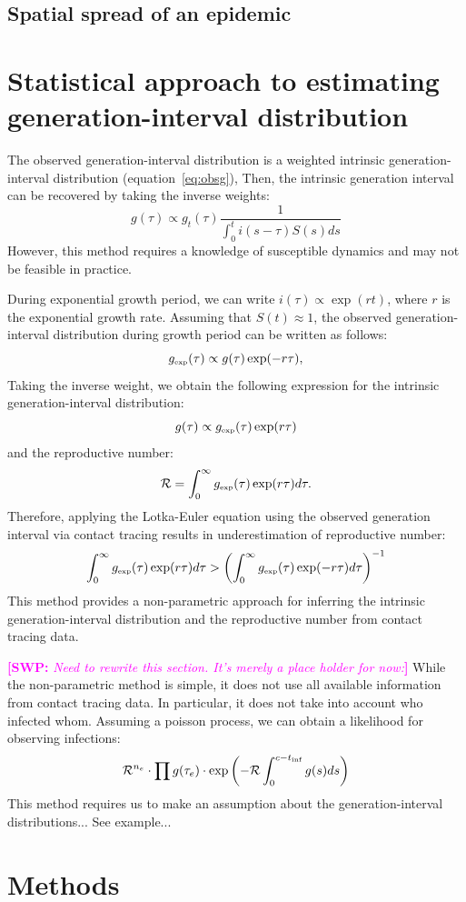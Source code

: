 \documentclass{article}
\newcommand{\RR}{\ensuremath{{\mathcal R}}}
\newcommand{\tsub}[2]{#1_{{\textrm{\tiny #2}}}}
\newcommand{\comment}[3]{\textcolor{#1}{\textbf{[#2: }\textsl{#3}\textbf{]}}}
\newcommand{\swp}[1]{\comment{magenta}{SWP}{#1}}
\begin{document}
\subsection{Spatial spread of an epidemic}

\section{Statistical approach to estimating generation-interval distribution}

The observed generation-interval distribution is a weighted intrinsic generation-interval distribution (equation~\ref{eq:obsg}),
Then, the intrinsic generation interval can be recovered by taking the inverse weights:
\begin{equation}
g(\tau) \propto g_t(\tau) \frac{1}{\int_{0}^t i(s-\tau) S(s) ds}
\end{equation}
However, this method requires a knowledge of susceptible dynamics and may not be feasible in practice.

During exponential growth period, we can write $i(\tau) \propto \exp(r t)$, where $r$ is the exponential growth rate.
Assuming that $S(t) \approx 1$, the observed generation-interval distribution during growth period can be written as follows:
\begin{equation}
\tsub{g}{exp}(\tau) \propto g(\tau) \exp(-r\tau),
\end{equation}
Taking the inverse weight, we obtain the following expression for the intrinsic generation-interval distribution:
\begin{equation}
g(\tau) \propto \tsub{g}{exp}(\tau) \exp(r\tau)
\end{equation}
and the reproductive number:
\begin{equation}
\RR = \int_0^\infty \tsub{g}{exp}(\tau) \exp(r\tau) d\tau.
\end{equation}
Therefore, applying the Lotka-Euler equation using the observed generation interval via contact tracing results in underestimation of reproductive number:
\begin{equation}
\int_0^\infty \tsub{g}{exp}(\tau) \exp(r\tau) d\tau > \left(\int_0^\infty \tsub{g}{exp}(\tau) \exp(-r\tau) d\tau\right)^{-1}
\end{equation}
This method provides a non-parametric approach for inferring the intrinsic generation-interval distribution and the reproductive number from contact tracing data.

\swp{Need to rewrite this section. It's merely a place holder for now:}
While the non-parametric method is simple, it does not use all available information from contact tracing data.
In particular, it does not take into account who infected whom.
Assuming a poisson process, we can obtain a likelihood for observing infections:
\begin{equation}
\RR^{n_e} \cdot \prod g(\tau_e) \cdot \exp \left(- \RR \int_0^{c - t_{\tiny\textrm{inf}}} g(s) ds \right)
\end{equation}
This method requires us to make an assumption about the generation-interval distributions... See example...




\section{Methods}




\end{document}
